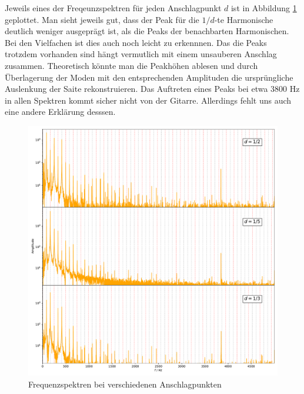 Jeweils eines der Freqeunzspektren für jeden Anschlagpunkt $d$ ist in Abbildung \ref{anschlagSpec} geplottet. Man sieht jeweils gut, dass der Peak für die $1/d$-te Harmonische deutlich weniger ausgeprägt ist, als die Peaks der benachbarten Harmonischen. Bei den Vielfachen ist dies auch noch leicht zu erkennnen. Das die Peaks trotzdem vorhanden sind hängt vermutlich mit einem unsauberen Anschlag zusammen. Theoretisch könnte man die Peakhöhen ablesen und durch Überlagerung der Moden mit den entsprechenden Amplituden die ursprüngliche Auslenkung der Saite rekonstruieren. Das Auftreten eines Peaks bei etwa 3800 Hz in allen Spektren kommt sicher nicht von der Gitarre. Allerdings fehlt uns auch eine andere Erklärung desssen.
\begin{figure}[h]
	\centering
	\includegraphics[width=\linewidth]{plots/anschlagspektrum.pdf}
	\caption{Frequenzspektren bei verschiedenen Anschlagpunkten}
	\label{anschlagSpec}
\end{figure}
\nopagebreak